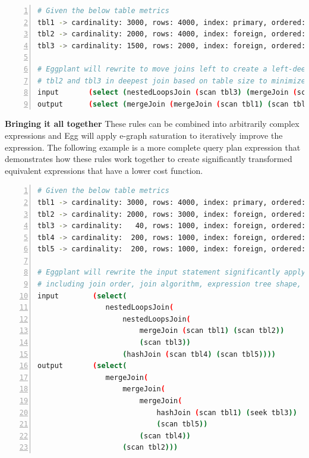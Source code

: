 \documentclass{article}
\begin{document}
\begin{lstlisting}[language=bash,
    frame=single, numbers=left, numbersep=5pt, numberstyle=\tiny\color{mygray},stringstyle=\ttfamily]
# Given the below table metrics
tbl1 -> cardinality: 3000, rows: 4000, index: primary, ordered: true
tbl2 -> cardinality: 2000, rows: 4000, index: foreign, ordered: false
tbl3 -> cardinality: 1500, rows: 2000, index: foreign, ordered: false

# Eggplant will rewrite to move joins left to create a left-deep plan, and swaps 
# tbl2 and tbl3 in deepest join based on table size to minimize intermediate results size
input       (select (nestedLoopsJoin (scan tbl3) (mergeJoin (scan tbl1) (scan tbl2))))
output      (select (mergeJoin (mergeJoin (scan tbl1) (scan tbl3)) (scan tbl2)))
\end{lstlisting}

\textbf{Bringing it all together} These rules can be combined into arbitrarily complex expressions
and Egg will apply e-graph saturation to iteratively improve the expression.  The following example
is a more complete query plan expression that demonstrates how these rules work together
to create significantly transformed equivalent expressions that have a lower cost function.

\begin{lstlisting}[language=bash,
    frame=single, numbers=left, numbersep=5pt, numberstyle=\tiny\color{mygray},stringstyle=\ttfamily]
# Given the below table metrics
tbl1 -> cardinality: 3000, rows: 4000, index: primary, ordered: true
tbl2 -> cardinality: 2000, rows: 3000, index: foreign, ordered: false
tbl3 -> cardinality:   40, rows: 1000, index: foreign, ordered: false
tbl4 -> cardinality:  200, rows: 1000, index: foreign, ordered: false
tbl5 -> cardinality:  200, rows: 1000, index: foreign, ordered: false

# Eggplant will rewrite the input statement significantly applying all the rewrite rules, 
# including join order, join algorithm, expression tree shape, and access method
input        (select(
                nestedLoopsJoin(
                    nestedLoopsJoin(
                        mergeJoin (scan tbl1) (scan tbl2)) 
                        (scan tbl3)) 
                    (hashJoin (scan tbl4) (scan tbl5))))
output       (select(
                mergeJoin(
                    mergeJoin(
                        mergeJoin(
                            hashJoin (scan tbl1) (seek tbl3)) 
                            (scan tbl5)) 
                        (scan tbl4)) 
                    (scan tbl2)))
\end{lstlisting}
\end{document}
